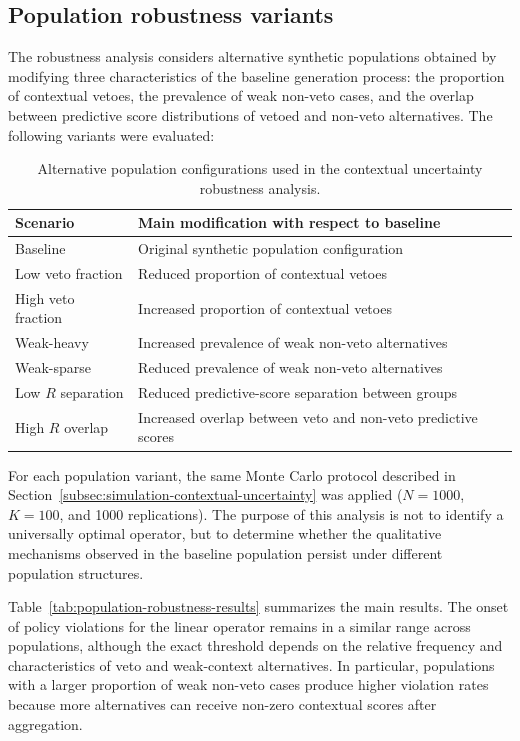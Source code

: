 \documentclass[mathematics,article,submit,moreauthors]{Definitions/mdpi}
\begin{document}
\subsection[\appendixname~\thesubsection]{Population robustness variants}
\label{app:population-robustness-variants}

The robustness analysis considers alternative synthetic populations obtained
by modifying three characteristics of the baseline generation process:
the proportion of contextual vetoes, the prevalence of weak non-veto cases,
and the overlap between predictive score distributions of vetoed and
non-veto alternatives. The following variants were evaluated:

\begin{table}[H]
\caption{Alternative population configurations used in the contextual
uncertainty robustness analysis.}
\label{tab:population-variants}
\centering
\small
\renewcommand{\arraystretch}{1.15}
\begin{tabular}{ll}
\toprule
Scenario & Main modification with respect to baseline\\
\midrule
Baseline & Original synthetic population configuration\\
Low veto fraction & Reduced proportion of contextual vetoes\\
High veto fraction & Increased proportion of contextual vetoes\\
Weak-heavy & Increased prevalence of weak non-veto alternatives\\
Weak-sparse & Reduced prevalence of weak non-veto alternatives\\
Low $R$ separation & Reduced predictive-score separation between groups\\
High $R$ overlap & Increased overlap between veto and non-veto predictive scores\\
\bottomrule
\end{tabular}
\end{table}

For each population variant, the same Monte Carlo protocol described in
Section~\ref{subsec:simulation-contextual-uncertainty} was applied
($N=1000$, $K=100$, and 1000 replications). The purpose of this analysis is
not to identify a universally optimal operator, but to determine whether the
qualitative mechanisms observed in the baseline population persist under
different population structures.

Table~\ref{tab:population-robustness-results} summarizes the main results.
The onset of policy violations for the linear operator remains in a similar
range across populations, although the exact threshold depends on the
relative frequency and characteristics of veto and weak-context alternatives.
In particular, populations with a larger proportion of weak non-veto cases
produce higher violation rates because more alternatives can receive
non-zero contextual scores after aggregation.
\end{document}
